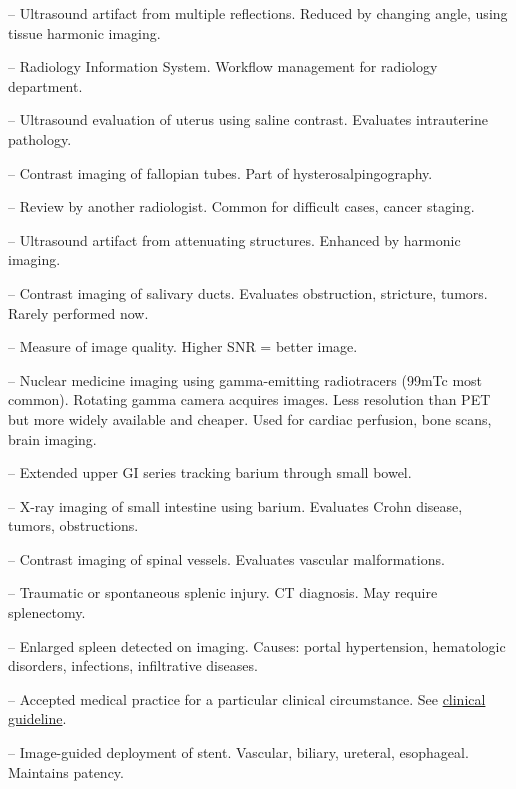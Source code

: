 -- Ultrasound artifact from multiple reflections. Reduced by changing angle, using tissue harmonic imaging.


-- Radiology Information System. Workflow management for radiology department.

-- Ultrasound evaluation of uterus using saline contrast. Evaluates intrauterine pathology.


-- Contrast imaging of fallopian tubes. Part of hysterosalpingography.

-- Review by another radiologist. Common for difficult cases, cancer staging.

-- Ultrasound artifact from attenuating structures. Enhanced by harmonic imaging.

-- Contrast imaging of salivary ducts. Evaluates obstruction, stricture, tumors. Rarely performed now.

-- Measure of image quality. Higher SNR = better image.

-- Nuclear medicine imaging using gamma-emitting radiotracers (99mTc most common). Rotating gamma camera acquires images. Less resolution than PET but more widely available and cheaper. Used for cardiac perfusion, bone scans, brain imaging.

-- Extended upper GI series tracking barium through small bowel.

-- X-ray imaging of small intestine using barium. Evaluates Crohn disease, tumors, obstructions.

-- Contrast imaging of spinal vessels. Evaluates vascular malformations.

-- Traumatic or spontaneous splenic injury. CT diagnosis. May require splenectomy.

-- Enlarged spleen detected on imaging. Causes: portal hypertension, hematologic disorders, infections, infiltrative diseases.

-- Accepted medical practice for a particular clinical circumstance. See \hyperlink{Clinical Guideline}{clinical guideline}.

-- Image-guided deployment of stent. Vascular, biliary, ureteral, esophageal. Maintains patency.

